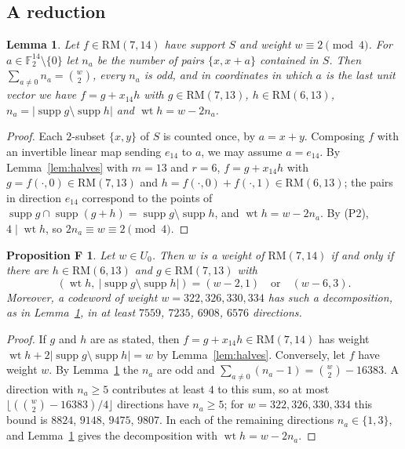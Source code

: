 \documentclass[11pt]{article}
\newtheorem{lemma}{Lemma}[section]
\newtheorem*{propF}{Proposition F}
\theoremstyle{remark}
\newcommand{\F}{\mathbb F}
\newcommand{\RM}{\mathrm{RM}}
\DeclareMathOperator{\wt}{wt}
\DeclareMathOperator{\supp}{supp}
\begin{document}
\subsection{A reduction}
\begin{lemma}\label{lem:dir}
Let $f\in\RM(7,14)$ have support $S$ and weight $w\equiv2\pmod4$. For
$a\in\F_2^{14}\setminus\{0\}$ let $n_a$ be the number of pairs $\{x,x+a\}$
contained in $S$. Then $\sum_{a\ne0}n_a=\binom w2$, every $n_a$ is odd, and in
coordinates in which $a$ is the last unit vector we have $f=g+x_{14}h$ with
$g\in\RM(7,13)$, $h\in\RM(6,13)$, $n_a=|\supp g\setminus\supp h|$ and
$\wt h=w-2n_a$.
\end{lemma}
\begin{proof}
Each $2$-subset $\{x,y\}$ of $S$ is counted once, by $a=x+y$. Composing $f$
with an invertible linear map sending $e_{14}$ to $a$, we may assume
$a=e_{14}$. By Lemma~\ref{lem:halves} with
$m=13$ and $r=6$, $f=g+x_{14}h$ with $g=f(\cdot,0)\in\RM(7,13)$ and
$h=f(\cdot,0)+f(\cdot,1)\in\RM(6,13)$; the pairs in direction $e_{14}$
correspond to the points of $\supp g\cap\supp(g+h)=\supp g\setminus\supp h$,
and $\wt h=w-2n_a$. By (P2), $4\mid\wt h$, so $2n_a\equiv w\equiv2\pmod4$.
\end{proof}

\begin{propF}
Let $w\in U_0$. Then $w$ is a weight of $\RM(7,14)$ if and only if there are
$h\in\RM(6,13)$ and $g\in\RM(7,13)$ with
\[
(\wt h,\ |\supp g\setminus\supp h|)=(w-2,1)\quad\text{or}\quad(w-6,3).
\]
Moreover, a codeword of weight $w=322,326,330,334$ has such a decomposition, as
in Lemma~\ref{lem:dir}, in at least $7559$, $7235$, $6908$, $6576$ directions.
\end{propF}
\begin{proof}
If $g$ and $h$ are as stated, then $f=g+x_{14}h\in\RM(7,14)$ has weight
$\wt h+2|\supp g\setminus\supp h|=w$ by Lemma~\ref{lem:halves}. Conversely,
let $f$ have weight $w$. By Lemma~\ref{lem:dir} the $n_a$ are odd and
$\sum_{a\ne0}(n_a-1)=\binom w2-16383$. A direction with $n_a\ge5$ contributes
at least $4$ to this sum, so at most $\lfloor(\binom w2-16383)/4\rfloor$
directions have $n_a\ge5$; for $w=322,326,330,334$ this bound is $8824$,
$9148$, $9475$, $9807$. In each of the remaining directions $n_a\in\{1,3\}$, and
Lemma~\ref{lem:dir} gives the decomposition with $\wt h=w-2n_a$.
\end{proof}
\end{document}
